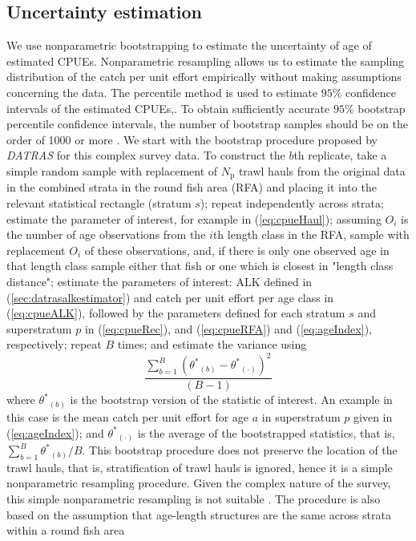 \documentclass[a4paper 12pt]{article}
\numberwithin{equation}{section}
\begin{document}
\subsection{Uncertainty estimation}
\label{sec:uncertaintyestimation}
We use nonparametric bootstrapping to estimate the uncertainty of age of estimated CPUEs. Nonparametric resampling allows us to estimate the sampling distribution of the catch per unit effort empirically without making assumptions concerning the data. The percentile method is used to estimate $95\%$ confidence intervals of the estimated CPUEs,. To obtain sufficiently accurate $95\%$ bootstrap percentile confidence intervals, the number of bootstrap samples should  be on the order of 1000 or more \citep[see][]{carpenter2000bootstrap}. 
\indent We start with the bootstrap procedure proposed by \emph{DATRAS} \citep{ICES2013} for this complex survey data. To construct the $b$th replicate, take a simple random sample with replacement of $N_{\text{p}}$ trawl hauls from the original data in the combined strata in the round fish area (RFA) and placing it into the relevant statistical rectangle (stratum $s$); repeat independently across strata; estimate the parameter of interest, for example in (\ref{eq:cpueHaul}); assuming $O_i$ is the number of age observations from the $i$th length class in the RFA, sample with replacement $O_i$ of these observations, and, if there is only one observed age in that length class sample either that fish or one which is closest in "length class distance"; estimate the parameters of interest: ALK defined in (\ref{sec:datrasalkestimator}) and catch per unit effort per age class in (\ref{eq:cpueALK}), followed by the parameters defined for each stratum $s$ and superstratum $p$ in (\ref{eq:cpueRec}), and (\ref{eq:cpueRFA}) and (\ref{eq:ageIndex}), respectively; repeat $B$ times; and estimate the variance using 
\begin{equation}
 \frac{ \sum_{b=1}^{B} {\left({{\theta}^{*}}_{(b)} - {{\theta}^{*}}_{(\cdot)} \right)}^{2}  }{(B-1)}  
 \label{eq:varianceforboot}
\end{equation}
where ${{\theta}^{*}}_{(b)} $ is the bootstrap version of the statistic of interest. An example in this case is the mean catch per unit effort for age $a$ in superstratum $p$ given in (\ref{eq:ageIndex}); and ${{\theta}^{*}}_{(\cdot)} $ is the average of the bootstrapped statistics, that is, $ \sum_{b=1}^{B} {{\theta}^{*}}_{(b)}/B$. This bootstrap procedure does not preserve the location of the trawl hauls, that is, stratification of trawl hauls is ignored, hence it is a simple nonparametric resampling procedure. Given the complex nature of the survey, this simple nonparametric resampling is not suitable \citep{kolenikov2010resampling}. The procedure is also based on the assumption that age-length structures are the same across strata within a round fish area  \\
\end{document}
